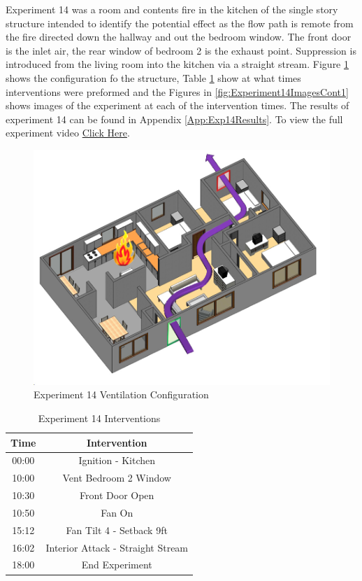 \documentclass{article}
\begin{document}
Experiment 14 was a room and contents fire in the kitchen of the single story structure intended to identify the potential effect as the flow path is remote from the fire directed down the hallway and out the bedroom window. The front door is the inlet air, the rear window of bedroom 2 is the exhaust point. Suppression is introduced from the living room into the kitchen via a straight stream. Figure \ref{fig:Exp14VentConfig} shows the configuration fo the structure, Table \ref{Table:Exp14Interventions} show at what times interventions were preformed and the Figures in \ref{fig:Experiment14ImagesCont1} shows images of the experiment at each of the intervention times. The results of experiment 14 can be found in Appendix \ref{App:Exp14Results}. To view the full experiment video \href{https://youtu.be/WzkDldq_ECA}{Click Here}.

\begin{figure}[H]
	\centering
	\includegraphics[width=5in]{0_Images/FireExperiments/Single_Story/Experiment_14.jpg}
	\caption{Experiment 14 Ventilation Configuration}
	\label{fig:Exp14VentConfig}
\end{figure}

\begin{table}[H]
	\centering
	\caption{Experiment 14 Interventions}
	\begin{tabular}{|c|c|} 
		\hline
		Time & Intervention \\ \hline \hline
		00:00 & Ignition - Kitchen \\ \hline
		10:00 & Vent Bedroom 2 Window \\ \hline
		10:30 & Front Door Open \\ \hline
		10:50 & Fan On \\ \hline
		15:12 & Fan Tilt 4 - Setback 9ft \\ \hline
		16:02 & Interior Attack - Straight Stream \\ \hline
		18:00 & End Experiment \\ \hline
	\end{tabular}
	\label{Table:Exp14Interventions}
\end{table}
\end{document}
